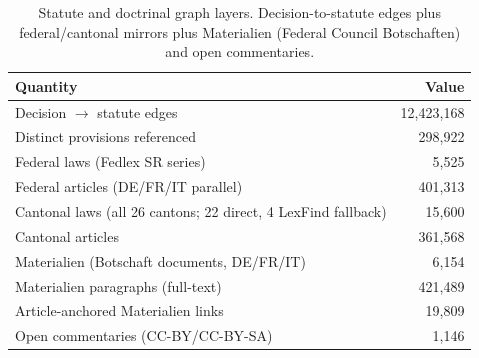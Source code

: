 \begin{table}[H]
\centering
\caption{Statute and doctrinal graph layers. Decision-to-statute edges plus federal/cantonal mirrors plus Materialien (Federal Council Botschaften) and open commentaries.}
\label{tab:statute_graph}
\small
\begin{tabular}{l r}
\toprule
\textbf{Quantity} & \textbf{Value} \\
\midrule
Decision $\to$ statute edges & 12,423,168 \\
Distinct provisions referenced & 298,922 \\
\addlinespace
Federal laws (Fedlex SR series) & 5,525 \\
Federal articles (DE/FR/IT parallel) & 401,313 \\
Cantonal laws (all 26 cantons; 22 direct, 4 LexFind fallback) & 15,600 \\
Cantonal articles & 361,568 \\
\addlinespace
Materialien (Botschaft documents, DE/FR/IT) & 6,154 \\
Materialien paragraphs (full-text) & 421,489 \\
Article-anchored Materialien links & 19,809 \\
\addlinespace
Open commentaries (CC-BY/CC-BY-SA) & 1,146 \\
\bottomrule
\end{tabular}
\end{table}
